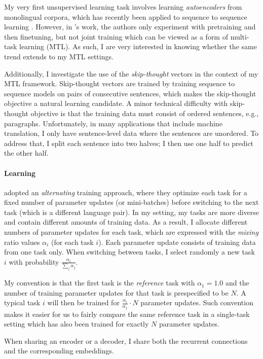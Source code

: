 My very first unsupervised learning task involves learning {\it autoencoders} from
monolingual corpora, which has recently been applied to sequence to sequence
learning \citep{dai15}. However, in \citet{dai15}'s work, the authors
only experiment with pretraining and then finetuning, but not joint training which
can be viewed as a form of multi-task learning (MTL). As such, I are
very interested in knowing whether the same trend extends to my MTL settings.

Additionally, I investigate the use of the {\it skip-thought}
vectors \citep{kiros15skip} in the context of my MTL framework.
Skip-thought vectors are trained by training sequence to sequence
models on pairs of consecutive sentences, which makes the skip-thought
objective a natural \ssl{} learning candidate. A minor technical
difficulty with skip-thought objective is that 
the training data must consist of ordered sentences, e.g., paragraphs.  Unfortunately, in
many applications that include machine translation, I only have
sentence-level data where the sentences are unordered. To
address that, I split each sentence into two halves; I then use 
one half to predict the other half.

\paragraph{Learning}
\cite{dong15} adopted an {\it alternating} training approach, where they
optimize each task for a fixed number of parameter updates (or
mini-batches) before switching to the next task (which is a different
language pair). In my setting, my tasks are more diverse and contain
different amounts of training data. As a result, I allocate different
numbers of parameter updates for each task, which are expressed with
the {\it mixing} ratio values $\alpha_i$ (for each task $i$). Each
parameter update consists of training data from one task only. When
switching between tasks, I select randomly a new task $i$ with
probability $\frac{\alpha_i}{\sum_j \alpha_j}$.


My convention is that the first task is the
{\it reference} task with $\alpha_1 = 1.0$ and the number of training
parameter updates for that task is prespecified to be $N$. A typical task $i$ will then be
trained for $\frac{\alpha_i}{\alpha_1}\cdot N$ parameter updates.
Such convention makes it easier for us to fairly compare the same reference
task in a single-task setting which has also been trained for exactly $N$
parameter updates.

When sharing an encoder or a decoder, I share both the recurrent connections
and the corresponding embeddings.



